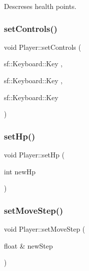Descreses health points. 

\mbox{\label{class_player_ab9820af1d231f97e0499b70ed6b34196}} 
\subsubsection{\texorpdfstring{setControls()}{setControls()}}
{\footnotesize\ttfamily void Player\+::set\+Controls (\begin{DoxyParamCaption}\item[{sf\+::\+Keyboard\+::\+Key}]{,  }\item[{sf\+::\+Keyboard\+::\+Key}]{,  }\item[{sf\+::\+Keyboard\+::\+Key}]{ }\end{DoxyParamCaption})}

\mbox{\label{class_player_ad2543da08ed26f833dafdb9711b3ce98}} 
\subsubsection{\texorpdfstring{setHp()}{setHp()}}
{\footnotesize\ttfamily void Player\+::set\+Hp (\begin{DoxyParamCaption}\item[{int}]{new\+Hp }\end{DoxyParamCaption})\hspace{0.3cm}{\ttfamily [inline]}}

\mbox{\label{class_player_a658ca673f68b8ba14f888b313f2f8fd3}} 
\subsubsection{\texorpdfstring{setMoveStep()}{setMoveStep()}}
{\footnotesize\ttfamily void Player\+::set\+Move\+Step (\begin{DoxyParamCaption}\item[{float \&}]{new\+Step }\end{DoxyParamCaption})\hspace{0.3cm}{\ttfamily [inline]}}

\mbox{\label{class_player_a9f37a6ecb0abbea3eed1348266135879}} 
